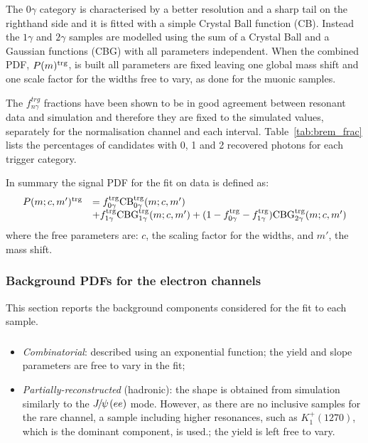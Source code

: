 The $0\gamma$ category is characterised by a better resolution and a sharp tail on the righthand
side and it is fitted with a simple Crystal Ball function (CB). Instead the $1\gamma$ and $2\gamma$
samples are modelled using the sum of a Crystal Ball and a Gaussian functions (CBG) with all parameters independent.
When the combined PDF, $P(m)^{\rm trg}$, is built all parameters are fixed leaving one global mass shift 
and one scale factor for the widths free to vary, as done for the muonic samples.


The $f^{trg}_{n\gamma}$ fractions have been shown to be in good agreement between 
resonant data and simulation and therefore they are fixed to the simulated values, separately
for the normalisation channel and each \qsq interval. Table~\ref{tab:brem_frac} lists the percentages
of candidates with 0, 1 and 2 recovered photons for each trigger category.

In summary the signal PDF for the fit on data is defined as:
%
\begin{equation}
\begin{array} {ll}
P(m;c,m')^{\rm trg} & = f^{\rm trg}_{0\gamma} \text{CB}^{\rm trg}_{0\gamma}(m;c,m')  \\
& + f^{\rm trg}_{1\gamma} \text{CBG}^{\rm trg}_{1\gamma}(m;c,m') + (1 - f^{\rm trg}_{0\gamma} - f^{\rm trg}_{1\gamma}) \text{CBG}^{\rm trg}_{2\gamma}(m;c,m')
\end{array} 
\end{equation}
%
where the free parameters are: $c$, the scaling factor for the widths, and $m'$, the mass shift.


\subsubsection{Background PDFs for the electron channels}
\label{sec:RKst_misreco_fit}

This section reports the background components considered for the fit to each sample.

\subsubsection*{\BdToKstGee}

\begin{itemize}

\item \textit{Combinatorial}: described using an exponential function; the yield and slope parameters are free to vary in the fit;

\item \textit{Partially-reconstructed} (hadronic): the shape is obtained from simulation similarly to the $\jpsi(ee)$ mode. 
However, as there are no inclusive samples for the rare channel, a sample including higher \Kstarz resonances, 
such as $K_1^+(1270)$, which is the dominant component, is used.; the yield is left free to vary.

\end{itemize}


